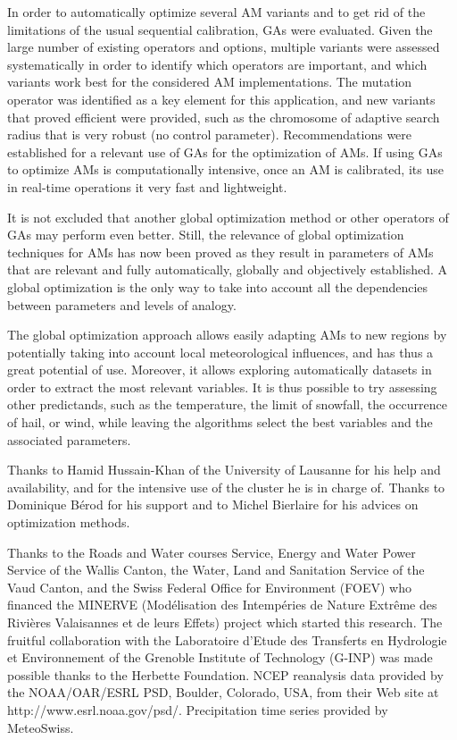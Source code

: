 \documentclass{ametsoc}
\begin{document}
In order to automatically optimize several AM variants and to get rid of the limitations of the usual sequential calibration, GAs were evaluated. Given the large number of existing operators and options, multiple variants were assessed systematically in order to identify which operators are important, and which variants work best for the considered AM implementations. The mutation operator was identified as a key element for this application, and new variants that proved efficient were provided, such as the chromosome of adaptive search radius that is very robust (no control parameter). Recommendations were established for a relevant use of GAs for the optimization of AMs. If using GAs to optimize AMs is computationally intensive, once an AM is calibrated, its use in real-time operations it very fast and lightweight.

It is not excluded that another global optimization method or other operators of GAs may perform even better. Still, the relevance of global optimization techniques for AMs has now been proved as they result in parameters of AMs that are relevant and fully automatically, globally and objectively established. A global optimization is the only way to take into account all the dependencies between parameters and levels of analogy.

The global optimization approach allows easily adapting AMs to new regions by potentially taking into account local meteorological influences, and has thus a great potential of use. Moreover, it allows exploring automatically datasets in order to extract the most relevant variables. It is thus possible to try assessing other predictands, such as the temperature, the limit of snowfall, the occurrence of hail, or wind, while leaving the algorithms select the best variables and the associated parameters.


%
\acknowledgments
Thanks to Hamid Hussain-Khan of the University of Lausanne for his help and availability, and for the intensive use of the cluster he is in charge of. Thanks to Dominique B\'{e}rod for his support and to Michel Bierlaire for his advices on optimization methods.

Thanks to the Roads and Water courses Service, Energy and Water Power Service of the Wallis Canton, the Water, Land and Sanitation Service of the Vaud Canton, and the Swiss Federal Office for Environment (FOEV) who financed the MINERVE (Mod\'{e}lisation des Intemp\'{e}ries de Nature Extr\^{e}me des Rivi\`{e}res Valaisannes et de leurs Effets) project which started this research. The fruitful collaboration with the Laboratoire d'Etude des Transferts en Hydrologie et Environnement of the Grenoble Institute of Technology (G-INP) was made possible thanks to the Herbette Foundation. NCEP reanalysis data provided by the NOAA/OAR/ESRL PSD, Boulder, Colorado, USA, from their Web site at http://www.esrl.noaa.gov/psd/. Precipitation time series provided by MeteoSwiss. 
\end{document}
